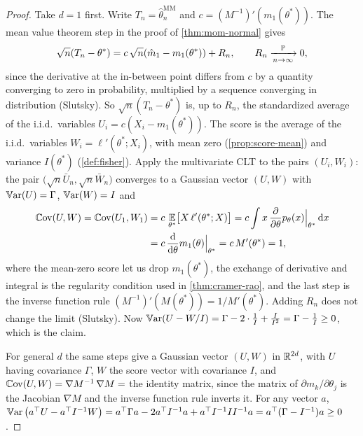 \begin{proof}
Take $d = 1$ first.
Write $T_n = \hat{\theta}_n^{\text{MM}}$ and $c = (M^{-1})'(m_1(\theta^*))$.
The mean value theorem step in the proof of \cref{thm:mom-normal} gives
\[
\sqrt{n}(T_n - \theta^*) = c\,\sqrt{n}(\hat{m}_1 - m_1(\theta^*)) + R_n, \qquad R_n \xrightarrow [n \to \infty ]{\mathbb{P}} 0,
\]
since the derivative at the in-between point differs from $c$ by a quantity converging to zero in probability, multiplied by a sequence converging in distribution (Slutsky).
So $\sqrt{n}(T_n - \theta^*)$ is, up to $R_n$, the standardized average of the i.i.d.\ variables $U_i = c(X_i - m_1(\theta^*))$.
The score is the average of the i.i.d.\ variables $W_i = \ell'(\theta^*; X_i)$, with mean zero (\cref{prop:score-mean}) and variance $I(\theta^*)$ (\cref{def:fisher}).
Apply the multivariate CLT to the pairs $(U_i, W_i)$: the pair $\big(\sqrt{n}\bar{U}_n, \sqrt{n}\bar{W}_n\big)$ converges to a Gaussian vector $(U, W)$ with $\operatorname*{\mathbb{V}\text{ar}}(U) = \Gamma$, $\operatorname*{\mathbb{V}\text{ar}}(W) = I$ and
\begin{align*}
\operatorname*{\mathbb{C}\text{ov}}(U, W) = \operatorname*{\mathbb{C}\text{ov}}(U_1, W_1) &= c\,\operatorname*{\mathbb{E}}_{\theta^*}\!\big[X\,\ell'(\theta^*; X)\big] = c \int x\,\frac{\partial}{\partial\theta}p_{\theta}(x)\Big|_{\theta^*}\,\mathrm{d}x \\
&= c\,\frac{\mathrm{d}}{\mathrm{d}\theta}m_1(\theta)\Big|_{\theta^*} = c\,M'(\theta^*) = 1,
\end{align*}
where the mean-zero score let us drop $m_1(\theta^*)$, the exchange of derivative and integral is the regularity condition used in \cref{thm:cramer-rao}, and the last step is the inverse function rule $(M^{-1})'(M(\theta^*)) = 1/M'(\theta^*)$.
Adding $R_n$ does not change the limit (Slutsky).
Now $\operatorname*{\mathbb{V}\text{ar}}(U - W/I) = \Gamma - 2\cdot\frac{1}{I} + \frac{I}{I^2} = \Gamma - \frac1I \geq 0$, which is the claim.

For general $d$ the same steps give a Gaussian vector $(U, W)$ in $\mathbb{R}^{2d}$, with $U$ having covariance $\Gamma$, $W$ the score vector with covariance $I$, and $\operatorname*{\mathbb{C}\text{ov}}(U, W) = \nabla M^{-1}\,\nabla M = $ the identity matrix, since the matrix of $\partial m_k/\partial\theta_j$ is the Jacobian $\nabla M$ and the inverse function rule inverts it.
For any vector $a$, $\operatorname*{\mathbb{V}\text{ar}}\big(a^\top U - a^\top I^{-1}W\big) = a^\top\Gamma a - 2a^\top I^{-1}a + a^\top I^{-1}II^{-1}a = a^\top(\Gamma - I^{-1})a \geq 0$.
\end{proof}

